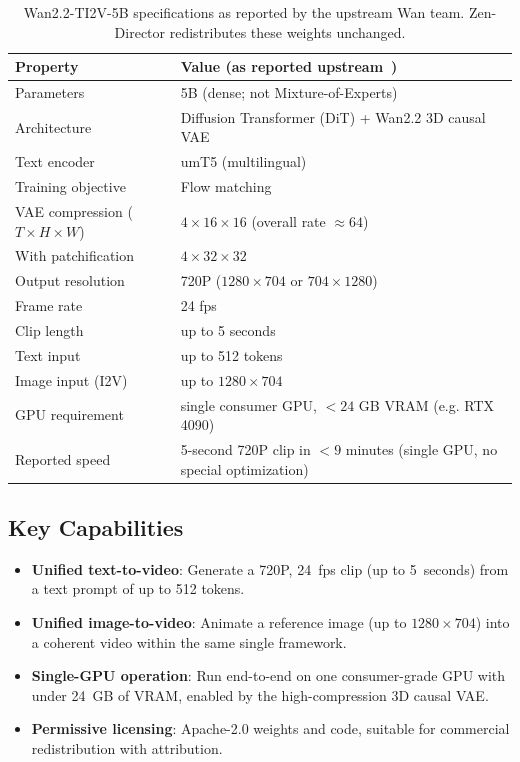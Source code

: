 \documentclass[11pt,a4paper]{article}
\begin{document}
\begin{table}[H]
\centering
\begin{tabular}{ll}
\toprule
\textbf{Property} & \textbf{Value (as reported upstream~\cite{wan22hf,wan22github})} \\
\midrule
Parameters & 5B (dense; not Mixture-of-Experts) \\
Architecture & Diffusion Transformer (DiT) + Wan2.2 3D causal VAE \\
Text encoder & umT5 (multilingual) \\
Training objective & Flow matching \\
VAE compression ($T\times H\times W$) & $4\times16\times16$ (overall rate $\approx 64$) \\
With patchification & $4\times32\times32$ \\
Output resolution & 720P ($1280\times704$ or $704\times1280$) \\
Frame rate & 24 fps \\
Clip length & up to 5 seconds \\
Text input & up to 512 tokens \\
Image input (I2V) & up to $1280\times704$ \\
GPU requirement & single consumer GPU, $<24$ GB VRAM (e.g. RTX 4090) \\
Reported speed & 5-second 720P clip in $<9$ minutes (single GPU, no special optimization) \\
\bottomrule
\end{tabular}
\caption{Wan2.2-TI2V-5B specifications as reported by the upstream Wan team. Zen-Director
redistributes these weights unchanged.}
\end{table}

\subsection{Key Capabilities}

\begin{itemize}
    \item \textbf{Unified text-to-video}: Generate a 720P, 24~fps clip (up to 5~seconds) from
    a text prompt of up to 512 tokens.
    \item \textbf{Unified image-to-video}: Animate a reference image (up to $1280\times704$)
    into a coherent video within the same single framework.
    \item \textbf{Single-GPU operation}: Run end-to-end on one consumer-grade GPU with under
    24~GB of VRAM, enabled by the high-compression 3D causal VAE.
    \item \textbf{Permissive licensing}: Apache-2.0 weights and code, suitable for commercial
    redistribution with attribution.
\end{itemize}
\end{document}
